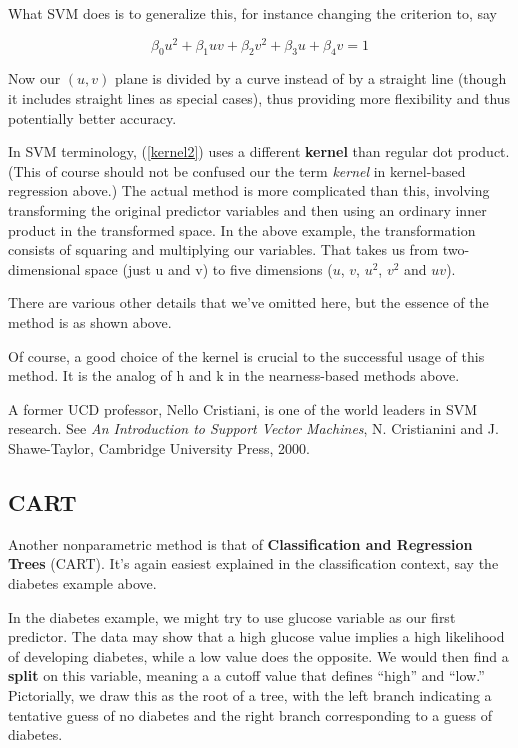 What SVM does is to generalize this, for instance changing the criterion
to, say

\begin{equation}
\label{kernel2}
\beta_0 u^2 + \beta_1 uv + \beta_2 v^2 + \beta_3 u + \beta_4 v = 1
\end{equation}

Now our $(u,v)$ plane is divided by a curve instead of by a straight
line (though it includes straight lines as special cases), thus
providing more flexibility and thus potentially better accuracy.

In SVM terminology, (\ref{kernel2}) uses a different {\bf kernel} than
regular dot product.  (This of course should not be confused our the
term {\it kernel} in kernel-based regression above.)  The actual method
is more complicated than this, involving transforming the original
predictor variables and then using an ordinary inner product in the
transformed space.  In the above example, the transformation consists of
squaring and multiplying our variables.  That takes us from
two-dimensional space (just u and v) to five dimensions ($u$, $v$,
$u^2$, $v^2$ and $uv$).

There are various other details that we've omitted here, but the essence
of the method is as shown above.

Of course, a good choice of the kernel is crucial to the successful
usage of this method.  It is the analog of h and k in the nearness-based
methods above.

A former UCD professor, Nello Cristiani, is one of the world leaders in
SVM research.  See {\it An Introduction to Support Vector Machines}, N.
Cristianini and J. Shawe-Taylor, Cambridge University Press, 2000.

\subsection{CART}

Another nonparametric method is that of {\bf Classification and
Regression Trees} (CART).  It's again easiest explained in the
classification context, say the diabetes example above.

In the diabetes example, we might try to use glucose variable as our
first predictor.  The data may show that a high glucose value implies a
high likelihood of developing diabetes, while a low value does the
opposite.  We would then find a {\bf split} on this variable, meaning a
a cutoff value that defines ``high'' and ``low.''  Pictorially, we draw
this as the root of a tree, with the left branch indicating a tentative
guess of no diabetes and the right branch corresponding to a guess of
diabetes.

